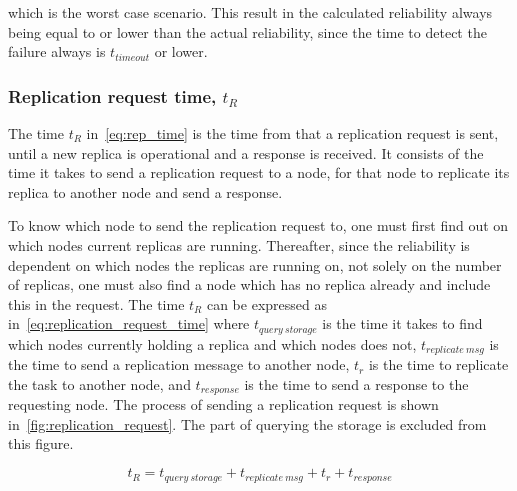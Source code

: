 \documentclass{cslthse-msc}
\begin{document}
which is the worst case scenario. This result in the calculated reliability always being equal to or lower than the actual reliability, since the time to detect the failure always is $t_{timeout}$ or lower.

\subsubsection{Replication request time, $t_R$} \label{sec:replication_time}
The time $t_R$ in~\cref{eq:rep_time} is the time from that a replication request is sent, until a new replica is operational and a response is received. It consists of the time it takes to send a replication request to a node, for that node to replicate its replica to another node and send a response.

To know which node to send the replication request to, one must first find out on which nodes current replicas are running. Thereafter, since the reliability is dependent on which nodes the replicas are running on, not solely on the number of replicas, one must also find a node which has no replica already and include this in the request. The time $t_R$ can be expressed as in~\cref{eq:replication_request_time} where $t_{query\ storage}$ is the time it takes to find which nodes currently holding a replica and which nodes does not, $t_{replicate\ msg}$ is the time to send a replication message to another node, $t_{r}$ is the time to replicate the task to another node, and $t_{response}$ is the time to send a response to the requesting node. The process of sending a replication request is shown in~\cref{fig:replication_request}. The part of querying the storage is excluded from this figure.

\begin{equation} \label{eq:replication_request_time}
t_R = t_{query\ storage} + t_{replicate\ msg} + t_{r} + t_{response}
\end{equation} 
\end{document}
